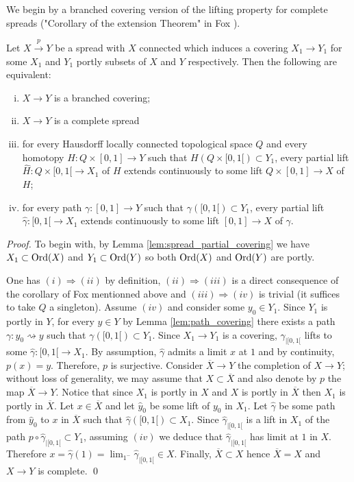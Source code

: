  We begin by a branched covering version of the lifting property for complete spreads ("Corollary of the extension Theorem" in Fox \cite{MR0123298}).
\begin{lem}\label{lem:complete_path_carac} 
 Let $X\xrightarrow{p} Y$ be a spread with $X$ connected which induces a covering $X_1\rightarrow Y_1$ for some $X_1$ and $Y_1$ portly subsets of $X$ and $Y$ respectively. Then the following are equivalent:
 \begin{enumerate}[(i)]
  \item $X\rightarrow Y$ is a branched covering;
  \item $X\rightarrow Y$ is a complete spread
  \item for every Hausdorff locally connected topological space $Q$ and every homotopy $H:Q\times [0,1]\rightarrow Y$ such that $H(Q\times [0,1[)\subset Y_1$, every partial lift 
  $\hat H : Q \times [0,1[ \rightarrow X_1$ of $H$ extends continuously to some lift $Q \times [0,1] \rightarrow X$ of $H$;
  \item for every path $\gamma:[0,1]\rightarrow Y$ such that $\gamma([0,1[) \subset Y_1$, every partial lift 
  $\hat \gamma : [0,1[ \rightarrow X_1$ extends continuously to some lift $[0,1] \rightarrow X$ of $\gamma$.
  
 \end{enumerate}
\end{lem}
\begin{proof}
To begin with, by Lemma \ref{lem:spread_partial_covering} we have $X_1\subset \mathrm{Ord}(X)$ and  $Y_1\subset \mathrm{Ord}(Y)$ so both $\mathrm{Ord}(X)$ and $\mathrm{Ord}(Y)$ are portly.



 One has $(i)\Rightarrow (ii)$ by definition, $(ii)\Rightarrow (iii)$ is a direct consequence of the corollary of Fox mentionned above and $(iii)\Rightarrow (iv)$ is trivial (it suffices to take $Q$ a singleton). 
 Assume $(iv)$ and consider some $y_0 \in Y_1$. Since $Y_1$ is portly in $Y$, for every $y\in Y$ by Lemma \ref{lem:path_covering} there exists a path $\gamma:y_0\rightsquigarrow y$ such that $\gamma([0,1[)\subset Y_1$. Since $X_1\rightarrow Y_1$ is a covering, $\gamma_{|[0,1[}$ lifts to some $\hat\gamma :[0,1[\rightarrow X_1$. By assumption, $\hat\gamma$ admits a limit $x$ at $1$ and by continuity, $p(x)=y$. Therefore, $p$ is surjective.  
 Consider $\overline X \rightarrow Y$ the completion of $X\rightarrow Y$; without loss of generality, we may assume that $X\subset \overline X$ and also denote by $p$ the map $\overline X\rightarrow Y$.   Notice that since $X_1$ is portly in $X$ and $X$ is portly in $\overline X$ then $X_1$ is portly in $\overline X$. Let $x \in \overline X$ and let $\hat y_0$ be some lift of $y_0$ in $X_1$. Let  $\hat \gamma$ be some path from $\hat y_0$ to $x$ in $\overline X$ such that $\hat\gamma([0,1[)\subset X_1$. Since $\hat\gamma_{|[0,1[}$ is a lift in $X_1$ of  the path $p\circ \hat \gamma_{|[0,1[} \subset Y_1$, assuming $(iv)$ we deduce that $\hat\gamma_{|[0,1[}$ has limit at $1$ in $X$. Therefore $x = \hat\gamma(1)= \lim_{1^-} \hat\gamma_{|[0,1[} \in X$. Finally, $\overline X\subset X$ hence $\overline X = X$ and $X\rightarrow Y$ is complete. 
\qed\end{proof}



